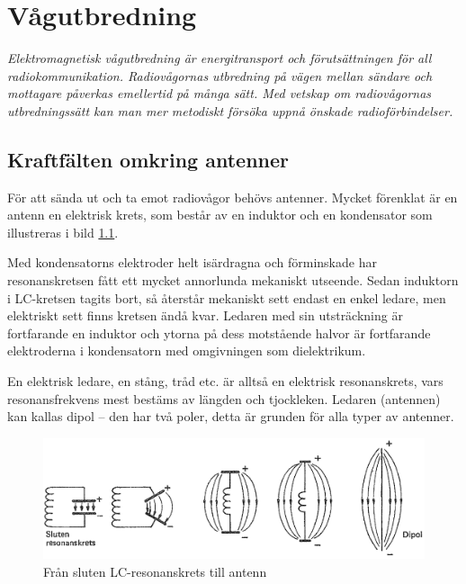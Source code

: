 \chapter{Vågutbredning}
\label{vågutbredning}

\emph{Elektromagnetisk vågutbredning är energitransport och
  förutsättningen för all radiokommunikation.
  Radiovågornas utbredning på vägen mellan sändare och mottagare påverkas
  emellertid på många sätt.
  Med vetskap om radiovågornas utbredningssätt kan man mer
  metodiskt försöka uppnå önskade radioförbindelser.}

\section[Kraftfält antenner]{Kraftfälten omkring antenner}

För att sända ut och ta emot radiovågor behövs antenner.
Mycket förenklat är en antenn en elektrisk krets, som består av en induktor
och en kondensator som illustreras i bild \ref{fig:BildII7-01}.

Med kondensatorns elektroder helt isärdragna och förminskade har
resonanskretsen fått ett mycket annorlunda mekaniskt utseende.
Sedan induktorn i LC-kretsen tagits bort, så återstår mekaniskt sett endast
en enkel ledare, men elektriskt sett finns kretsen ändå kvar.
Ledaren med sin utsträckning är fortfarande en induktor och ytorna på dess
motstående halvor är fortfarande elektroderna i kondensatorn med
omgivningen som dielektrikum.

En elektrisk ledare, en stång, tråd etc. är alltså en elektrisk
resonanskrets, vars resonansfrekvens mest bestäms av längden och
tjockleken. Ledaren (antennen) kan kallas dipol -- den har två poler,
detta är grunden för alla typer av antenner.

\begin{figure}
\includegraphics[width=\textwidth]{images/cropped_pdfs/bild_2_7-01.pdf}
\caption{Från sluten LC-resonanskrets till antenn}
\label{fig:BildII7-01}
\end{figure}

